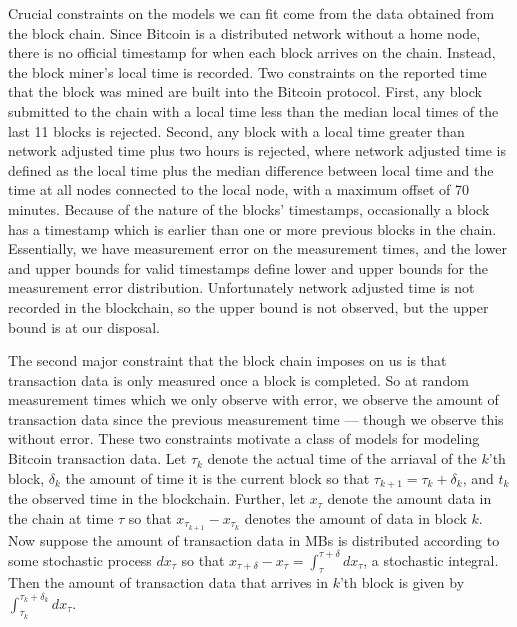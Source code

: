 \documentclass{article}
\begin{document}
Crucial constraints on the models we can fit come from the data obtained from the block chain. Since Bitcoin is a distributed network without a home node, there is no official timestamp for when each block arrives on the chain. Instead, the block miner's local time is recorded. Two constraints on the reported time that the block was mined are built into the Bitcoin protocol. First, any block submitted to the chain with a local time less than the median local times of the last 11 blocks is rejected. Second, any block with a local time greater than network adjusted time plus two hours is rejected, where network adjusted time is defined as the local time plus the median difference between local time and the time at all nodes connected to the local node, with a maximum offset of 70 minutes. Because of the nature of the blocks' timestamps, occasionally a block has a timestamp which is earlier than one or more previous blocks in the chain. Essentially, we have measurement error on the measurement times, and the lower and upper bounds for valid timestamps define lower and upper bounds for the measurement error distribution. Unfortunately network adjusted time is not recorded in the blockchain, so the upper bound is not observed, but the upper bound is at our disposal.

The second major constraint that the block chain imposes on us is that transaction data is only measured once a block is completed. So at random measurement times which we only observe with error, we observe the amount of transaction data since the previous measurement time --- though we observe this without error. These two constraints motivate a class of models for modeling Bitcoin transaction data. Let $\tau_k$ denote the actual time of the arriaval of the $k$'th block, $\delta_k$ the amount of time it is the current block so that $\tau_{k+1}=\tau_k + \delta_k$, and $t_k$ the observed time in the blockchain. Further, let $x_\tau$ denote the amount data in the chain at time $\tau$ so that $x_{\tau_{k+1}} - x_{\tau_k}$ denotes the amount of data in block $k$. Now suppose the amount of transaction data in MBs is distributed according to some stochastic process $dx_\tau$ so that $x_{\tau + \delta} - x_\tau = \int_\tau^{\tau + \delta}dx_\tau$, a stochastic integral. Then the amount of transaction data that arrives in $k$'th block is given by $\int_{\tau_k}^{\tau_{k}+\delta_k}dx_\tau$. 
\end{document}

